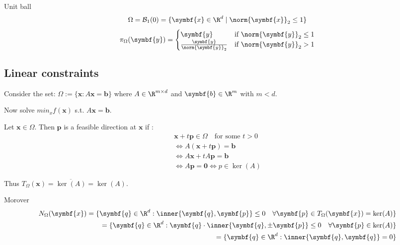 \begin{example}{Unit ball}{}
	\[
		\Omega = \mathcal{B}_1(0) = \{ \symbf{x} \in \R^d \mid \norm{\symbf{x}}_2 \leq 1 \}
	\]
	\[
		\pi_{\Omega}(\symbf{y}) = \begin{cases}
			\symbf{y}                            & \text{if } \norm{\symbf{y}}_2 \leq 1 \\
			\frac{\symbf{y}}{\norm{\symbf{y}}_2} & \text{if } \norm{\symbf{y}}_2 > 1
		\end{cases}
	\]
\end{example}

\subsection{Linear constraints}

Consider the set: \(\Omega := \{\symbf{x} : A\symbf{x} = \symbf{b}\}\) where \(A \in \R^{m \times d}\) and \(\symbf{b} \in \R^m\) with \(m < d\).

Now solve \(min_x f(\symbf{x})\) s.t. \(A\symbf{x} = \symbf{b}\).

Let \(\symbf{x} \in \Omega\). Then \(\symbf{p}\) is a feasible direction at \(\symbf{x}\) if :
\begin{align*}
	\symbf{x} + t \symbf{p} \in \Omega \quad \text{for some } t > 0 \\
	\iff A(\symbf{x} + t \symbf{p}) = \symbf{b}                     \\
	\iff A\symbf{x} + t A\symbf{p} = \symbf{b}                      \\
	\iff A\symbf{p} = \symbf{0} \iff p\in \ker(A)
\end{align*}

Thus \(T_{\Omega}(\symbf{x}) = \overline{\ker(A)} = \ker(A)\).

Morover
\begin{align*}
	N_{\Omega}(\symbf{x}) = \{\symbf{q} \in \R^d : \inner{\symbf{q}, \symbf{p}} \leq 0 \quad \forall \symbf{p} \in T_{\Omega}(\symbf{x}) = \ker(A)\} \\
	= \{\symbf{q} \in \R^d : \symbf{q} \cdot \inner{\symbf{q}, \pm \symbf{p}} \leq 0 \quad \forall \symbf{p} \in \ker(A)\}                           \\
	= \{\symbf{q} \in \R^d : \inner{\symbf{q}, \symbf{q}} = 0\}
\end{align*}

